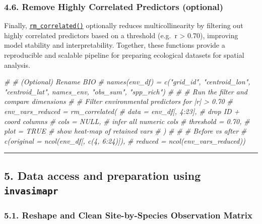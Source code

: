 \documentclass[
]{article}
\newenvironment{Shaded}{\begin{snugshade}}{\end{snugshade}}
\newcommand{\CommentTok}[1]{\textcolor[rgb]{0.56,0.35,0.01}{\textit{#1}}}
\begin{document}
\hypertarget{remove-highly-correlated-predictors-optional}{%
\subsubsection{4.6. Remove Highly Correlated Predictors
(optional)}\label{remove-highly-correlated-predictors-optional}}

Finally,
\href{https://macsands.github.io/dissmapr/reference/rm_correlated.html}{\texttt{rm\_correlated()}}
optionally reduces multicollinearity by filtering out highly correlated
predictors based on a threshold (e.g.~r \textgreater{} 0.70), improving
model stability and interpretability. Together, these functions provide
a reproducible and scalable pipeline for preparing ecological datasets
for spatial analysis.

\begin{Shaded}
\begin{Highlighting}[]
\CommentTok{\# \# (Optional) Rename BIO}
\CommentTok{\# names(env\_df) = c("grid\_id", "centroid\_lon", "centroid\_lat", names\_env, "obs\_sum", "spp\_rich")}
\CommentTok{\#   }
\CommentTok{\# \# Run the filter and compare dimensions}
\CommentTok{\# \# Filter environmental predictors for |r| \textgreater{} 0.70}
\CommentTok{\# env\_vars\_reduced = rm\_correlated(}
\CommentTok{\#   data       = env\_df[, 4:23],  \# drop ID + coord columns}
\CommentTok{\#   cols       = NULL,                  \# infer all numeric cols}
\CommentTok{\#   threshold  = 0.70,}
\CommentTok{\#   plot       = TRUE                   \# show heat{-}map of retained vars}
\CommentTok{\# )}
\CommentTok{\# }
\CommentTok{\# \# Before vs after}
\CommentTok{\# c(original = ncol(env\_df[, c(4, 6:24)]),}
\CommentTok{\#   reduced  = ncol(env\_vars\_reduced))}
\end{Highlighting}
\end{Shaded}

\begin{center}\rule{0.5\linewidth}{0.5pt}\end{center}

\hypertarget{data-access-and-preparation-using-invasimapr}{%
\subsection{\texorpdfstring{5. Data access and preparation using
\texttt{invasimapr}}{5. Data access and preparation using invasimapr}}\label{data-access-and-preparation-using-invasimapr}}

\hypertarget{reshape-and-clean-site-by-species-observation-matrix}{%
\subsubsection{5.1. Reshape and Clean Site-by-Species Observation
Matrix}\label{reshape-and-clean-site-by-species-observation-matrix}}
\end{document}

